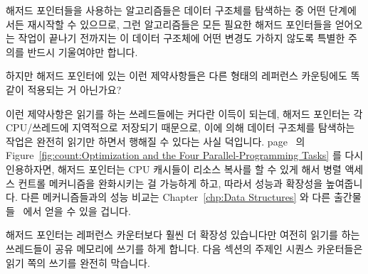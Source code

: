 해저드 포인터들을 사용하는 알고리즘들은 데이터 구조체를 탐색하는 중 어떤
단계에서든 재시작할 수 있으므로, 그런 알고리즘들은 모든 필요한 해저드
포인터들을 얻어오는 작업이 끝나기 전까지는 이 데이터 구조체에 어떤 변경도
가하지 않도록 특별한 주의를 반드시 기울여야만 합니다.

\QuickQuiz{}
	하지만 해저드 포인터에 있는 이런 제약사항들은 다른 형태의 레퍼런스
	카운팅에도 똑같이 적용되는 거 아닌가요?

\QuickQuizAnswer{
	이런 제약사항은 레퍼런스 획득이 실패할 수 있는 레퍼런스 카운팅
	메커니즘들에만 적용됩니다.

} \QuickQuizEnd

이런 제약사항은 읽기를 하는 쓰레드들에는 커다란 이득이 되는데, 해저드 포인터는
각 CPU/쓰레드에 지역적으로 저장되기 때문으로, 이에 의해 데이터 구조체를
탐색하는 작업은 완전히 읽기만 하면서 행해질 수 있다는 사실 덕입니다.
page~\pageref{fig:count:Optimization and the Four Parallel-Programming Tasks}
의
Figure~\ref{fig:count:Optimization and the Four Parallel-Programming Tasks}
를 다시 인용하자면, 해저드 포인터는 CPU 캐시들이 리소스 복사를 할 수 있게 해서
병렬 액세스 컨트롤 메커니즘을 완화시키는 걸 가능하게 하고, 따라서 성능과
확장성을 높여줍니다.
다른 메커니즘들과의 성능 비교는 Chapter~\ref{chp:Data Structures} 와 다른
출간물들~\cite{ThomasEHart2007a,McKenney:2013:SDS:2483852.2483867,MagedMichael04a}
에서 얻을 수 있을 겁니다.

해저드 포인터는 레퍼런스 카운터보다 훨씬 더 확장성 있습니다만 여전히 읽기를
하는 쓰레드들이 공유 메모리에 쓰기를 하게 합니다.
다음 섹션의 주제인 시퀀스 카운터들은 읽기 쪽의 쓰기를 완전히 막습니다.

